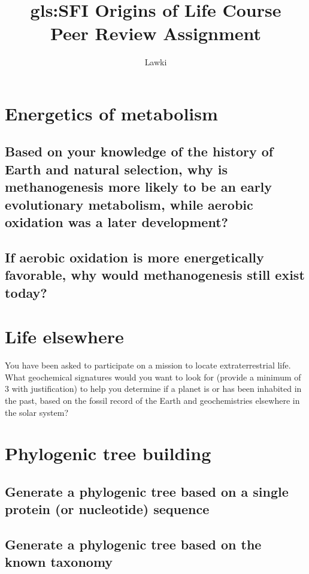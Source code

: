 \documentclass[]{article}
\title{
	\gls{gls:SFI} Origins of Life Course\\
	Peer Review Assignment}
\author{Lawki}
\begin{document}
\maketitle

\begin{abstract}

\end{abstract}

\section{Energetics of metabolism}

\subsection{
	Based on your knowledge of the history of Earth and natural selection, why is methanogenesis more likely to be an early evolutionary metabolism, while aerobic oxidation was a later development?
}

\subsection{
	If aerobic oxidation is more energetically favorable, why would methanogenesis still exist today?}

\section{Life elsewhere}

You have been asked to participate on a mission to locate extraterrestrial life. What geochemical signatures would you want to look for (provide a minimum of 3 with justification) to help you determine if a planet is or has been inhabited in the past, based on the fossil record of the Earth and geochemistries elsewhere in the solar system?

\section{Phylogenic tree building}

\subsection{ Generate a phylogenic tree
	based on a single protein (or
	nucleotide) sequence}

\subsection{ Generate a phylogenic tree
	based on the known taxonomy}
\end{document}
